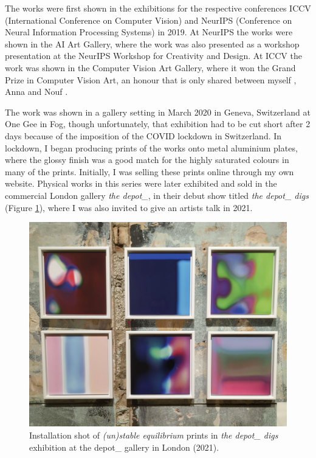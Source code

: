 The works were first shown in the exhibitions for the respective conferences ICCV (International Conference on Computer Vision) and NeurIPS (Conference on Neural Information Processing Systems) in 2019. 
At NeurIPS the works were shown in the AI Art Gallery, where the work was also presented as a workshop presentation at the NeurIPS Workshop for Creativity and Design. 
At ICCV the work was shown in the Computer Vision Art Gallery, where it won the Grand Prize in Computer Vision Art, an honour that is only shared between myself \citep{broad2019unstable}, Anna \citet{ridler2018mosaic} and Nouf \citet{aljowaysir2021salaf}.

The work was shown in a gallery setting in March 2020 in Geneva, Switzerland at One Gee in Fog, though unfortunately, that exhibition had to be cut short after 2 days because of the imposition of the COVID lockdown in Switzerland. 
In lockdown, I began producing prints of the works onto metal aluminium plates, where the glossy finish was a good match for the highly saturated colours in many of the prints. 
Initially, I was selling these prints online through my own website. Physical works in this series were later exhibited and sold in the commercial London gallery \textit{the depot\_}, in their debut show titled \textit{the depot\_ digs} \citep{depot2021digs} (Figure \ref{fig:c7:depot_digs}), where I was also invited to give an artists talk in 2021.

\begin{figure}[!htb]
    \centering
    \captionsetup{justification=centering}
    \includegraphics[width=1\textwidth]{figures/c7_impact/depot_cropped.png}
    \caption[Installation shot of \textit{(un)stable equilibrium} in the depot\_ gallery]{Installation shot of \textit{(un)stable equilibrium} prints in \textit{the depot\_ digs} exhibition at the depot\_ gallery in London (2021).}
    \label{fig:c7:depot_digs}
\end{figure}

